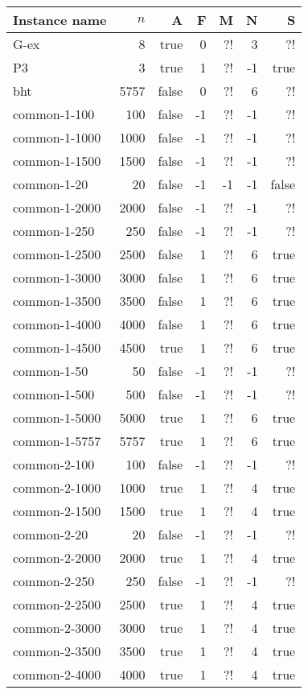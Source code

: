 
\medskip
\begin{longtable}{lrrrrrr}
\toprule
	Instance name & $n$ & A & F & M & N & S\\
	\midrule
	G-ex & 8 & true & 0 & ?! & 3 & ?!\\
	P3 & 3 & true & 1 & ?! & -1 & true\\
	bht & 5757 & false & 0 & ?! & 6 & ?!\\
	common-1-100 & 100 & false & -1 & ?! & -1 & ?!\\
	common-1-1000 & 1000 & false & -1 & ?! & -1 & ?!\\
	common-1-1500 & 1500 & false & -1 & ?! & -1 & ?!\\
	common-1-20 & 20 & false & -1 & -1 & -1 & false\\
	common-1-2000 & 2000 & false & -1 & ?! & -1 & ?!\\
	common-1-250 & 250 & false & -1 & ?! & -1 & ?!\\
	common-1-2500 & 2500 & false & 1 & ?! & 6 & true\\
	common-1-3000 & 3000 & false & 1 & ?! & 6 & true\\
	common-1-3500 & 3500 & false & 1 & ?! & 6 & true\\
	common-1-4000 & 4000 & false & 1 & ?! & 6 & true\\
	common-1-4500 & 4500 & true & 1 & ?! & 6 & true\\
	common-1-50 & 50 & false & -1 & ?! & -1 & ?!\\
	common-1-500 & 500 & false & -1 & ?! & -1 & ?!\\
	common-1-5000 & 5000 & true & 1 & ?! & 6 & true\\
	common-1-5757 & 5757 & true & 1 & ?! & 6 & true\\
	common-2-100 & 100 & false & -1 & ?! & -1 & ?!\\
	common-2-1000 & 1000 & true & 1 & ?! & 4 & true\\
	common-2-1500 & 1500 & true & 1 & ?! & 4 & true\\
	common-2-20 & 20 & false & -1 & ?! & -1 & ?!\\
	common-2-2000 & 2000 & true & 1 & ?! & 4 & true\\
	common-2-250 & 250 & false & -1 & ?! & -1 & ?!\\
	common-2-2500 & 2500 & true & 1 & ?! & 4 & true\\
	common-2-3000 & 3000 & true & 1 & ?! & 4 & true\\
	common-2-3500 & 3500 & true & 1 & ?! & 4 & true\\
	common-2-4000 & 4000 & true & 1 & ?! & 4 & true\\

\end{longtable}
